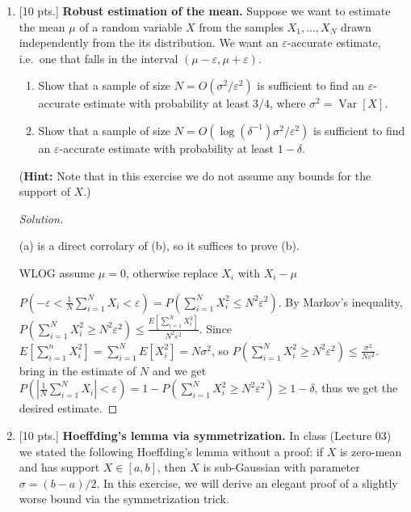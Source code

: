 \documentclass[12pt,letterpaper]{article}
\newenvironment{solution}{%
  \begin{proof}[Solution]$ $\par\nobreak\ignorespaces
}{%
  \end{proof}
}
\begin{document}
\begin{enumerate}
\item {[10 pts.]}
{\bf Robust estimation of the mean.} Suppose we want to  estimate the mean $\mu$ of a random variable $X$ from the samples $X_{1}, \ldots, X_{N}$ drawn independently from the its distribution. We want an $\varepsilon$-accurate estimate, i.e.~one that falls in the interval $(\mu-\varepsilon, \mu+\varepsilon)$.
\begin{enumerate}[label=(\alph*)]
    \item Show that a sample of size $N=O\left(\sigma^{2} / \varepsilon^{2}\right)$ is sufficient to find an $\varepsilon$-accurate estimate with probability at least $3 / 4$, where $\sigma^{2}=\operatorname{Var}[X]$.
    \item Show that a sample of size $N=O\left(\log \left(\delta^{-1}\right) \sigma^{2} / \varepsilon^{2}\right)$ is sufficient to find an $\varepsilon$-accurate estimate with probability at least $1-\delta$.
\end{enumerate}
(\textbf{Hint:} Note that in this exercise we do not assume any bounds for the support of $X$.)
\begin{solution}
  (a) is a direct corrolary of (b), so it suffices to prove (b).
  
  WLOG assume $\mu=0$, otherwise replace $X_{i}$ with $X_{i}-\mu$

  $P(-\varepsilon<\frac{1}{N}\sum_{i=1}^{N}X_{i}<\varepsilon)=P(\sum_{i=1}^{N}X_{i}^{2}\leq N^{2}\varepsilon^{2})$. By Markov's inequality, $P(\sum_{i=1}^{N}X_{i}^{2}\geq N^{2}\varepsilon^{2})\leq \frac{E[\sum_{i=1}^{N}X_{i}^{2}]}{N^{2}\varepsilon^{2}}$. Since $E[\sum_{i=1}^{n}X_{i}^{2}]=\sum_{i=1}^{N}E[X_{i}^{2}]=N\sigma^{2}$, so $P(\sum_{i=1}^{N}X_{i}^{2}\geq N^{2}\varepsilon^{2})\leq \frac{\sigma^{2}}{N\varepsilon^{2}}$. bring in the estimate of $N$ and we get $P(|\frac{1}{N}\sum_{i=1}^{N}X_{i}|<\varepsilon)=1-P(\sum_{i=1}^{N}X_{i}^{2}\geq N^{2}\varepsilon^{2})\geq 1-\delta$, thus we get the desired estimate.

\end{solution}

\item {[10 pts.]} {\bf Hoeffding's lemma via symmetrization.}
In class (Lecture 03) we stated the following Hoeffding's lemma without a proof: if $X$ is zero-mean and has support $X \in [a, b]$, then $X$ is sub-Gaussian with parameter $\sigma=(b-a)/2$. In this exercise, we will derive an elegant proof of a slightly worse bound via the symmetrization trick.


\end{enumerate}
\end{document}
